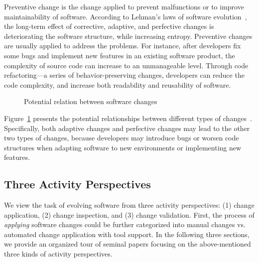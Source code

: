 \documentclass[runningheads,a4paper]{llncs}
\begin{document}
Preventive change is the change applied to prevent malfunctions or to improve maintainability of software. 
According to Lehman's laws of software evolution~\cite{Lehman1984:ULE}, the long-term effect of corrective, adaptive, and perfective changes is deteriorating the software structure, while increasing entropy. Preventive changes are usually applied to address the problems. For instance, after developers fix some bugs and implement new features in an existing software product, the complexity of source code can increase to an unmanageable level. Through code refactoring---a series of behavior-preserving changes, developers can reduce the code complexity, and increase both readability and reusability of software.
\begin{figure}[!htb]
\centering
{}
\caption{Potential relation between software changes~\cite{Seaman2008:SMC}}
\label{fig:relation}
\end{figure}

Figure~\ref{fig:relation} presents the potential relationships between different types of changes~\cite{Seaman2008:SMC}. Specifically, both adaptive changes and perfective changes may lead to the other two types of changes, because developers may introduce bugs or worsen code structures when adapting software to new environments or implementing new features.

\subsection{Three Activity Perspectives} 
\label{sec:activity} 
We view the task of evolving software from three activity perspectives: (1) change application, (2) change inspection, and (3) change validation. First, the process of {\em applying} software changes could be further categorized into manual changes vs. automated change application with tool support. In the following three sections, we provide an organized tour of seminal papers focusing on the above-mentioned three kinds of activity perspectives. 
\end{document}
